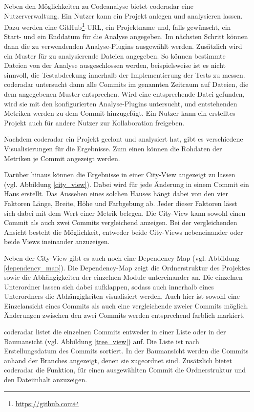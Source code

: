 \documentclass[
	oneside,  %
	ngerman, 
	final, 
	11pt, 
	a4paper, 
	1.1headlines, 
	headinclude=false, 
	footinclude=false, 
	mpinclude=false, 
	pagesize, 
	onecolumn, 
	titlepage, 
	parskip=half, 
	headsepline, 
	chapterprefix=false, 
	version=first, 
	listof=totoc, 
	bibliography=totoc, 
	toc=graduated, 
	fleqn
]{scrbook}
\begin{document}
Neben den Möglichkeiten zu Codeanalyse bietet coderadar eine Nutzerverwaltung.
Ein Nutzer kann ein Projekt anlegen und analysieren lassen.
Dazu werden eine GitHub\footnote{\url{https://github.com}}-URL, ein Projektname und, falls gewünscht, ein Start- und ein Enddatum für die Analyse angegeben.
Im nächsten Schritt können dann die zu verwendenden Analyse-Plugins ausgewählt werden.
Zusätzlich wird ein Muster für zu analysierende Dateien angegeben.
So können bestimmte Dateien von der Analyse ausgeschlossen werden, beispielsweise ist es nicht sinnvoll, die Testabdeckung innerhalb der Implementierung der Tests zu messen.
coderadar untersucht dann alle Commits im genannten Zeitraum auf Dateien, die dem angegebenen Muster entsprechen.
Wird eine entsprechende Datei gefunden, wird sie mit den konfigurierten Analyse-Plugins untersucht, und entstehenden Metriken werden zu dem Commit hinzugefügt.
Ein Nutzer kann ein erstelltes Projekt auch für andere Nutzer zur Kollaboration freigeben.

Nachdem coderadar ein Projekt geclont und analysiert hat, gibt es verschiedene Visualisierungen für die Ergebnisse.
Zum einen können die Rohdaten der Metriken je Commit angezeigt werden.

Darüber hinaus können die Ergebnisse in einer \glqq City-View\grqq{} angezeigt zu lassen (vgl. Abbildung \ref{city_view}).
Dabei wird für jede Änderung in einem Commit ein \glqq Haus\grqq{} erstellt.
Das Aussehen eines solchen Hauses hängt dabei von den vier Faktoren Länge, Breite, Höhe und Farbgebung ab.
Jeder dieser Faktoren lässt sich dabei mit dem Wert einer Metrik belegen.
Die City-View kann sowohl einen Commit als auch zwei Commits vergleichend anzeigen.
Bei der vergleichenden Ansicht besteht die Möglichkeit, entweder beide City-Views nebeneinander oder beide Views ineinander anzuzeigen.

Neben der City-View gibt es auch noch eine \glqq Dependency-Map\grqq{} (vgl. Abbildung \ref{dependency_map}).
Die Dependency-Map zeigt die Ordnerstruktur des Projektes sowie die Abhängigkeiten der einzelnen Module untereinander an.
Die einzelnen Unterordner lassen sich dabei aufklappen, sodass auch innerhalb eines Unterordners die Abhängigkeiten visualisiert werden.
Auch hier ist sowohl eine Einzelansicht eines Commits als auch eine vergleichende zweier Commits möglich.
Änderungen zwischen den zwei Commits werden entsprechend farblich markiert.

coderadar listet die einzelnen Commits entweder in einer Liste oder in der Baumansicht (vgl. Abbildung \ref{tree_view}) auf.
Die Liste ist nach Erstellungsdatum des Commits sortiert. 
In der Baumansicht werden die Commits anhand der Branches angezeigt, denen sie zugeordnet sind.
Zusätzlich bietet coderadar die Funktion, für einen ausgewählten Commit die Ordnerstruktur und den Dateiinhalt anzuzeigen.
\end{document}
